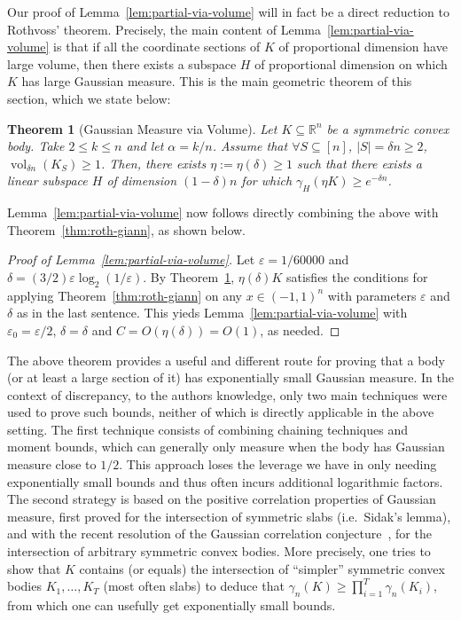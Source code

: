 \documentclass[12pt]{article}
\newtheorem{theorem}{Theorem}
\newcommand{\R}{{\mathbb{R}}}
\newcommand\eps{\varepsilon}
\DeclareMathOperator{\vol}{vol}
\begin{document}
Our proof of Lemma~\ref{lem:partial-via-volume} will in fact be a direct
reduction to Rothvoss' theorem. Precisely, the main content of
Lemma~\ref{lem:partial-via-volume} is that if all the coordinate sections of $K$
of proportional dimension have large volume, then there exists a subspace $H$ of
proportional dimension on which $K$ has large Gaussian measure. This is the main
geometric theorem of this section, which we state below: 

\begin{theorem}[Gaussian Measure via Volume]
\label{thm:gauss-via-volume}
Let $K \subseteq \R^n$ be a symmetric convex body. Take $2 \leq k \leq n$ and
let $\alpha = k/n$. Assume that $\forall S \subseteq [n]$, $|S| = \delta n \geq
2$, $\vol_{\delta n}(K_S) \geq 1$. Then, there exists $\eta := \eta(\delta) \geq
1$ such that there exists a linear subspace $H$ of dimension $(1-\delta)n$ for
which $\gamma_H(\eta K) \geq e^{-\delta n}$.
\end{theorem}

Lemma~\ref{lem:partial-via-volume} now follows directly combining the above with
Theorem~\ref{thm:roth-giann}, as shown below.

\begin{proof}[Proof of Lemma~\ref{lem:partial-via-volume}] 
Let $\eps = 1/60000$ and $\delta = (3/2) \eps \log_2(1/\eps)$. By
Theorem~\ref{thm:gauss-via-volume}, $\eta(\delta) K$ satisfies the conditions
for applying Theorem~\ref{thm:roth-giann} on any $x \in (-1,1)^n$ with
parameters $\eps$ and $\delta$ as in the last sentence. This yieds
Lemma~\ref{lem:partial-via-volume} with $\eps_0 = \eps/2$, $\delta = \delta$ and
$C = O(\eta(\delta)) = O(1)$, as needed.   
\end{proof}

The above theorem provides a useful and different route for proving that a body
(or at least a large section of it) has exponentially small Gaussian measure. In
the context of discrepancy, to the authors knowledge, only two main techniques
were used to prove such bounds, neither of which is directly applicable in the above
setting. The first technique consists of combining chaining techniques and
moment bounds, which can generally only measure when the body has Gaussian
measure close to $1/2$.  This approach loses the leverage we have in only
needing exponentially small bounds and thus often incurs additional
logarithmic factors. The second strategy is based on the positive correlation
properties of Gaussian measure, first proved for the intersection of symmetric
slabs (i.e.~Sidak's lemma), and with the recent resolution of the Gaussian
correlation conjecture~\cite{Royen14}, for the intersection of arbitrary
symmetric convex bodies. More precisely, one tries to show that $K$ contains (or
equals) the intersection of ``simpler'' symmetric convex bodies $K_1,\dots,K_T$
(most often slabs) to deduce that $\gamma_n(K) \geq \prod_{i=1}^T
\gamma_n(K_i)$, from which one can usefully get exponentially small bounds.
\end{document}
